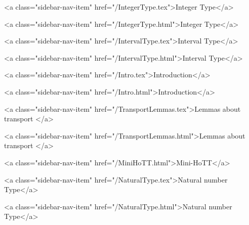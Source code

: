       
        
          <a class="sidebar-nav-item" href="/IntegerType.tex">Integer Type</a>
        
      
    
      
        
          <a class="sidebar-nav-item" href="/IntegerType.html">Integer Type</a>
        
      
    
      
        
          <a class="sidebar-nav-item" href="/IntervalType.tex">Interval Type</a>
        
      
    
      
        
          <a class="sidebar-nav-item" href="/IntervalType.html">Interval Type</a>
        
      
    
      
        
          <a class="sidebar-nav-item" href="/Intro.tex">Introduction</a>
        
      
    
      
        
          <a class="sidebar-nav-item" href="/Intro.html">Introduction</a>
        
      
    
      
        
          <a class="sidebar-nav-item" href="/TransportLemmas.tex">Lemmas about transport </a>
        
      
    
      
        
          <a class="sidebar-nav-item" href="/TransportLemmas.html">Lemmas about transport </a>
        
      
    
      
        
          <a class="sidebar-nav-item" href="/MiniHoTT.html">Mini-HoTT</a>
        
      
    
      
        
          <a class="sidebar-nav-item" href="/NaturalType.tex">Natural number Type</a>
        
      
    
      
        
          <a class="sidebar-nav-item" href="/NaturalType.html">Natural number Type</a>
        
      
    
